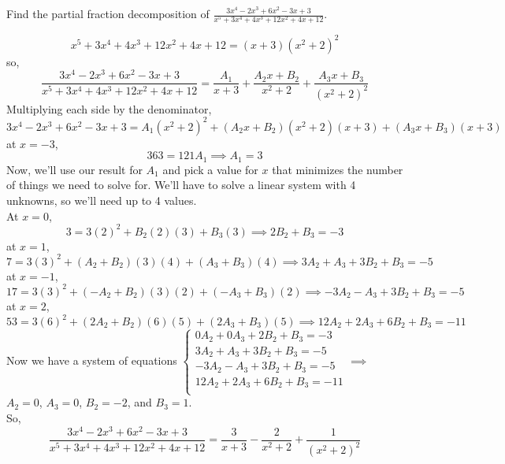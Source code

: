 \begin{example}
	Find the partial fraction decomposition of $\frac{3x^4-2x^3+6x^2-3x+3}{x^5+3x^4+4x^3+12x^2+4x+12}$.
\end{example}
\begin{equation*}
	x^5+3x^4+4x^3+12x^2+4x+12 = (x+3)(x^2+2)^2
\end{equation*}
so,
\begin{equation*}
	\frac{3x^4-2x^3+6x^2-3x+3}{x^5+3x^4+4x^3+12x^2+4x+12} = \frac{A_1}{x+3}+\frac{A_2x+B_2}{x^2+2}+\frac{A_3x+B_3}{(x^2+2)^2}
\end{equation*}
Multiplying each side by the denominator,
\begin{equation*}
	3x^4-2x^3+6x^2-3x+3 = A_1(x^2+2)^2+(A_2x+B_2)(x^2+2)(x+3)+(A_3x+B_3)(x+3)
\end{equation*}
at $x=-3$,
\begin{equation*}
	363 = 121A_1 \implies A_1 = 3
\end{equation*}
Now, we'll use our result for $A_1$ and pick a value for $x$ that minimizes the number of things we need to solve for. We'll have to solve a linear system with 4 unknowns, so we'll need up to 4 values.\\
At $x=0$,
\begin{equation*}
	3 = 3(2)^2 + B_2(2)(3)+B_3(3) \implies 2B_2 + B_3 = -3
\end{equation*}
at $x=1$,
\begin{equation*}
	7 = 3(3)^2 + (A_2+B_2)(3)(4) + (A_3+B_3)(4) \implies 3A_2 + A_3 + 3B_2 + B_3 = -5
\end{equation*}
at $x=-1$,
\begin{equation*}
17 = 3(3)^2 + (-A_2+B_2)(3)(2) + (-A_3+B_3)(2) \implies -3A_2 - A_3 + 3B_2 + B_3 = -5
\end{equation*}
at $x=2$,
\begin{equation*}
	53 = 3(6)^2 + (2A_2+B_2)(6)(5) + (2A_3+B_3)(5) \implies 12A_2 + 2A_3 + 6B_2 + B_3 = -11
\end{equation*}
Now we have a system of equations
$ \begin{cases}
	0A_2  + 0A_3 + 2B_2 + B_3 = -3 \\
	3A_2  + A_3  + 3B_2 + B_3 = -5 \\
	-3A_2 - A_3  + 3B_2 + B_3 = -5 \\
	12A_2 + 2A_3 + 6B_2 + B_3 = -11 \\
\end{cases}
\implies$ $A_2 = 0$, $A_3 = 0$, $B_2 = -2$, and $B_3 = 1$.\\
So,
\begin{equation*}
	\frac{3x^4-2x^3+6x^2-3x+3}{x^5+3x^4+4x^3+12x^2+4x+12} = \frac{3}{x+3}-\frac{2}{x^2+2}+\frac{1}{(x^2+2)^2}
\end{equation*}